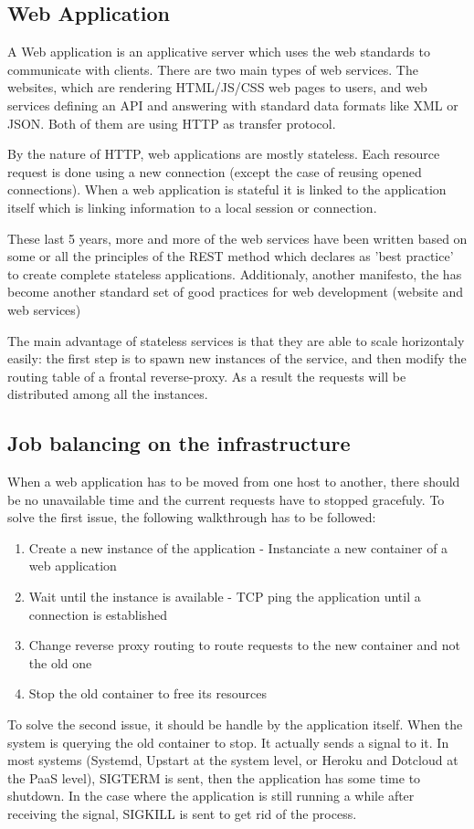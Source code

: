 \subsection{Web Application}

A Web application is an applicative server which uses the web standards to
communicate with clients. There are two main types of web services. The
websites, which are rendering HTML/JS/CSS web pages to users, and web services
defining an API and answering with standard data formats like XML or JSON. Both
of them are using HTTP as transfer protocol.

By the nature of HTTP, web applications are mostly stateless. Each resource
request is done using a new connection (except the case of reusing opened
connections). When a web application is stateful it is linked to the
application itself which is linking information to a local session or
connection.

These last 5 years, more and more of the web services have been written based
on some or all the principles of the REST method which declares as 'best
practice' to create complete stateless applications. Additionaly, another
manifesto, the \cite{website12Factors} has become another standard set of good
practices for web development (website and web services)

The main advantage of stateless services is that they are able to scale
horizontaly easily: the first step is to spawn new instances of the service,
and then modify the routing table of a frontal reverse-proxy. As a result the
requests will be distributed among all the instances.

\subsection{Job balancing on the infrastructure}

When a web application has to be moved from one host to another, there should
be no unavailable time and the current requests have to stopped gracefuly. To
solve the first issue, the following walkthrough has to be followed:

\begin{enumerate}
	\item{Create a new instance of the application - Instanciate a new
	container of a web application}
	\item{Wait until the instance is available - TCP ping the application
	until a connection is established}
	\item{Change reverse proxy routing to route requests to the new
	container and not the old one}
	\item{Stop the old container to free its resources}
\end{enumerate}

To solve the second issue, it should be handle by the application itself. When
the system is querying the old container to stop. It actually sends a signal to
it.  In most systems (Systemd, Upstart at the system level, or Heroku and
Dotcloud at the PaaS level), SIGTERM is sent, then the application has some
time to shutdown. In the case where the application is still running a while
after receiving the signal, SIGKILL is sent to get rid of the process.
